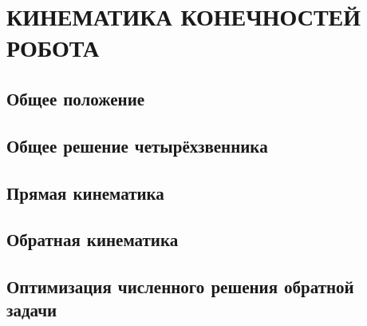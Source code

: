 \chapter{\MakeUppercase{Кинематика конечностей робота}}
\section{Общее положение}


\section{Общее решение четырёхзвенника}


\section{Прямая кинематика}


\section{Обратная кинематика}


\section{Оптимизация численного решения обратной задачи}